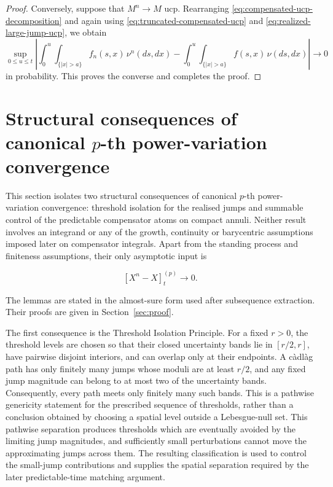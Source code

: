 \documentclass[a4paper,10pt]{article}
\begin{document}
\begin{proof}
Conversely, suppose that \(M^n\to M\) ucp. Rearranging
\eqref{eq:compensated-ucp-decomposition} and again using
\eqref{eq:truncated-compensated-ucp} and
\eqref{eq:realized-large-jump-ucp}, we obtain
\[
\sup_{0\le u\le t}
\left|
\int_0^u\int_{\{|x|>a\}}
f_n(s,x)\,\nu^n(ds,dx)
-
\int_0^u\int_{\{|x|>a\}}
f(s,x)\,\nu(ds,dx)
\right|
\longrightarrow0
\]
in probability. This proves the converse and completes the proof.
\end{proof}


\section{Structural consequences of canonical \(p\)-th
power-variation convergence}
\label{sec:structure}

This section isolates two structural consequences of canonical
\(p\)-th power-variation convergence: threshold isolation for the
realised jumps and summable control of the predictable compensator
atoms on compact annuli. Neither result involves an integrand or any
of the growth, continuity or barycentric assumptions imposed later
on compensator integrals. Apart from the standing process and
finiteness assumptions, their only asymptotic input is

$$
        [X^n-X]^{(p)}_t
        \longrightarrow0.
$$

The lemmas are stated in the almost-sure form used after subsequence
extraction. Their proofs are given in Section~\ref{sec:proof}.


The first consequence is the Threshold Isolation Principle. For a
fixed \(r>0\), the threshold levels are chosen so that their closed
uncertainty bands lie in \([r/2,r]\), have pairwise disjoint interiors,
and can overlap only at their endpoints. A càdlàg path has only
finitely many jumps whose moduli are at least \(r/2\), and any fixed
jump magnitude can belong to at most two of the uncertainty bands.
Consequently, every path meets only finitely many such bands. This is
a pathwise genericity statement for the prescribed sequence of
thresholds, rather than a conclusion obtained by choosing a spatial
level outside a Lebesgue-null set. This
pathwise separation produces thresholds which are eventually avoided
by the limiting jump magnitudes, and sufficiently small perturbations
cannot move the approximating jumps across them. The resulting
classification is used to control the small-jump contributions and
supplies the spatial separation required by the later predictable-time
matching argument.
\end{document}
